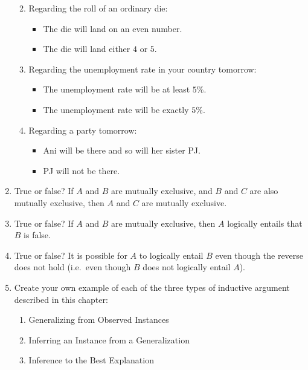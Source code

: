 \documentclass[justified]{tufte-book}
\providecommand{\tightlist}{%
  \setlength{\itemsep}{0pt}\setlength{\parskip}{0pt}}
\theoremstyle{definition}
\theoremstyle{definition}
\theoremstyle{definition}
\theoremstyle{remark}
\begin{document}
\begin{enumerate}
  \begin{enumerate}
  \def\labelenumii{\alph{enumii}.}
  \item
    Regarding the roll of an ordinary die:

    \begin{itemize}
    \tightlist
    \item
      The die will land on an even number.
    \item
      The die will land either \(4\) or \(5\).
    \end{itemize}
  \item
    Regarding the unemployment rate in your country tomorrow:

    \begin{itemize}
    \tightlist
    \item
      The unemployment rate will be at least \(5\%\).
    \item
      The unemployment rate will be exactly \(5\%\).
    \end{itemize}
  \item
    Regarding a party tomorrow:

    \begin{itemize}
    \tightlist
    \item
      Ani will be there and so will her sister PJ.
    \item
      PJ will not be there.
    \end{itemize}
  \end{enumerate}
\item
  True or false? If \(A\) and \(B\) are mutually exclusive, and \(B\) and \(C\) are also mutually exclusive, then \(A\) and \(C\) are mutually exclusive.
\item
  True or false? If \(A\) and \(B\) are mutually exclusive, then \(A\) logically entails that \(B\) is false.
\item
  True or false? It is possible for \(A\) to logically entail \(B\) even though the reverse does not hold (i.e.~even though \(B\) does not logically entail \(A\)).
\item
  Create your own example of each of the three types of inductive argument described in this chapter:

  \begin{enumerate}
  \def\labelenumii{\alph{enumii}.}
  \tightlist
  \item
    Generalizing from Observed Instances
  \item
    Inferring an Instance from a Generalization
  \item
    Inference to the Best Explanation
  \end{enumerate}
\end{enumerate}
\end{document}

